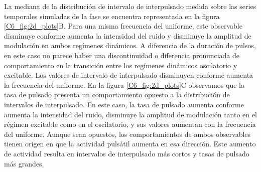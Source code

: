 \documentclass[./main.tex]{subfiles}
\begin{document}
La mediana de la distribución de intervalo de interpulsado medida sobre las series temporales simuladas de la fase se encuentra representada en la figura \ref{C6_fig:2d_plots}B. Para una misma frecuencia del uniforme, este observable disminuye conforme aumenta la intensidad del ruido y disminuye la amplitud de modulación en ambos regímenes dinámicos. A diferencia de la duración de pulsos, en este caso no parece haber una discontinuidad o diferencia pronunciada de comportamiento en la transición entre los regímenes dinámicos oscilatorio y excitable. Los valores de intervalo de interpulsado disminuyen conforme aumenta la frecuencia del uniforme. En la figura \ref{C6_fig:2d_plots}C observamos que la tasa de pulsado presenta un comportamiento opuesto a la distribución de intervalos de interpulsado. En este caso, la tasa de pulsado aumenta conforme aumenta la intensidad del ruido, disminuye la amplitud de modulación tanto en el régimen excitable como en el oscilatorio, y sus valores aumentan con la frecuencia del uniforme. Aunque sean opuestos, los comportamientos de ambos observables tienen origen en que la actividad pulsátil aumenta en esa dirección. Este aumento de actividad resulta en intervalos de interpulsado más cortos y tasas de pulsado más grandes. 
\end{document}
